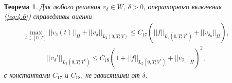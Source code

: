\documentclass[14pt, a4paper]{extarticle}
\newtheorem{theorem}{Теорема}[section]
\numberwithin{equation}{section}
\begin{document}
    \begin{theorem}
        Для любого решения $v_\delta \in W, \ \delta > 0$, операторного включения (\ref{eq:4.6})
        справедливы оценки
        \begin{equation}\label{eq:5.3}
            \begin{gathered}
                \max_{t \in [0,T]} ||v_\delta(t)||_H + ||v_\delta||_{L_2(0,T;V)} \leq
                C_{17} (||f||_{L_2(0,T;V^*)} + ||v_{\delta_0}||_H),
            \end{gathered}
        \end{equation}
        \begin{equation}\label{eq:5.4}
            \begin{gathered}
                ||v_\delta'||_{L_1(0,T;V^*)} \leq C_{18} (1 + ||f||_{L_2(0,T;V^*)} + ||v_{\delta_0}||_H)^2,
            \end{gathered}
        \end{equation}
        с константами $C_{17}$ и $C_{18}$, не зависящими от $\delta$. 
    \end{theorem}
\end{document}
